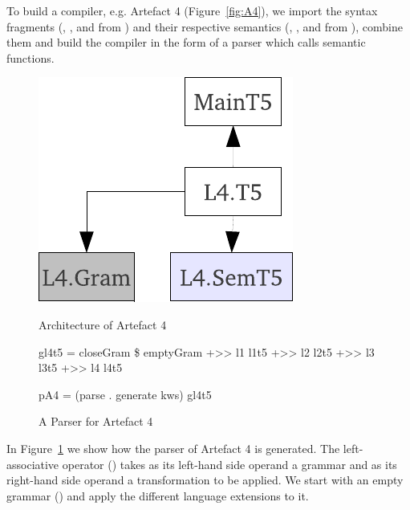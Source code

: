 To build a compiler, e.g. Artefact 4 (Figure~\ref{fig:A4}), we import the syntax fragments (, , 
 and  
from ) and their respective semantics (, 
,  and  from ), 
combine them and build the compiler in the form of a parser which calls semantic functions.
\begin{figure}[th]
\begin{minipage}[b]{0.5\linewidth}
\begin{center}
	\includegraphics[scale=0.6]{cococo/main.pdf}
\caption{Architecture of Artefact 4}
\label{fig:A4}
\end{center}
\end{minipage}
\hspace{0.2cm}
\begin{minipage}[b]{0.5\linewidth}
\begin{haskell}
gl4t5 = closeGram \$ emptyGram +>> 
                    l1 l1t5   +>> 
                    l2 l2t5   +>> 
                    l3 l3t5   +>> 
                    l4 l4t5

pA4 = (parse . generate kws) gl4t5
\end{haskell}
\vspace{-15pt}
\caption{A Parser for Artefact 4}
\label{fig:pA4}
\end{minipage}
\hspace{0.5cm}
\end{figure}
In Figure~\ref{fig:pA4} we show how the parser of Artefact 4 is generated. 
The left-associative operator (\texthaskell{+>>}) takes as its left-hand side operand a grammar and as its right-hand side operand a  transformation to be applied.
We start with an empty grammar () and apply the different language extensions to it.
